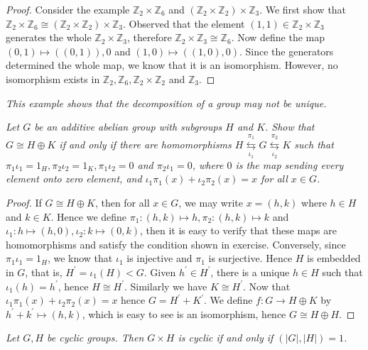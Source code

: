 \begin{proof}
Consider the example $\mathbb{Z}_2\times\mathbb{Z}_6$ and $(\mathbb{Z}_2\times\mathbb{Z}_2)\times\mathbb{Z}_3$. We first show that $\mathbb{Z}_2\times\mathbb{Z}_6\cong(\mathbb{Z}_2\times\mathbb{Z}_2)\times\mathbb{Z}_3$. Observed that the element $(1,1)\in\mathbb{Z}_2\times\mathbb{Z}_3$ generates the whole $\mathbb{Z}_2\times\mathbb{Z}_3$, therefore $\mathbb{Z}_2\times\mathbb{Z}_3\cong\mathbb{Z}_6$. Now define the map $(0,1)\mapsto((0,1)),0$ and $(1,0)\mapsto((1,0),0)$. Since the generators determined the whole map, we know that it is an isomorphism. However, no isomorphism exists in $\mathbb{Z}_2,\mathbb{Z}_6,\mathbb{Z}_2\times\mathbb{Z}_2$ and $\mathbb{Z}_3$.
\end{proof}
\begin{note}\em
This example shows that the decomposition of a group may not be unique.
\end{note}
\begin{problem}\em
Let $G$ be an additive abelian group with subgroups $H$ and $K$. Show that $G\cong H\oplus K$ if and only if there are homomorphisms $H\underset{\iota _1}{\overset{\pi _1}{\leftrightarrows}}G\underset{\iota _2}{\overset{\pi _2}{\leftrightarrows}}K$ such that $\pi_1\iota_1=1_H,\pi_2\iota_2=1_K,\pi_1\iota_2=0$ and $\pi_2\iota_1=0$, where $0$ is the map sending every element onto zero element, and $\iota_1\pi_1(x)+\iota_2\pi_2(x)=x$ for all $x\in G$.
\end{problem}
\begin{proof}
If $G\cong H\oplus K$, then for all $x\in G$, we may write $x=(h,k)$ where $h\in H$ and $k\in K$. Hence we define $\pi_1:(h,k)\mapsto h,\pi_2:(h,k)\mapsto k$ and $\iota_1:h\mapsto(h,0),\iota_2:k\mapsto(0,k)$, then it is easy to verify that these maps are homomorphisms and satisfy the condition shown in exercise. Conversely, since $\pi_1\iota_1=1_H$, we know that $\iota_1$ is injective and $\pi_1$ is surjective. Hence $H$ is embedded in $G$, that is, $H^\prime=\iota_1(H)<G$. Given $h^\prime\in H^\prime$, there is a unique $h\in H$ such that $\iota_1(h)=h^\prime$, hence $H\cong H^\prime$. Similarly we have $K\cong H^\prime$. Now that $\iota_1\pi_1(x)+\iota_2\pi_2(x)=x$ hence $G=H^\prime+K^\prime$. We define $f:G\to H\oplus K$ by $h^\prime+k^\prime\mapsto(h,k)$, which is easy to see is an isomorphism, hence $G\cong H\oplus H$.
\end{proof}
\begin{problem}\em
Let $G,H$ be cyclic groups. Then $G\times H$ is cyclic if and only if $(|G|,|H|)=1$.
\end{problem}
